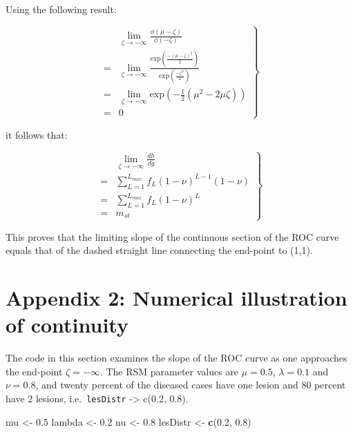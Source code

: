\documentclass[
]{book}
\newenvironment{Shaded}{\begin{snugshade}}{\end{snugshade}}
\newcommand{\FloatTok}[1]{\textcolor[rgb]{0.00,0.00,0.81}{#1}}
\newcommand{\KeywordTok}[1]{\textcolor[rgb]{0.13,0.29,0.53}{\textbf{#1}}}
\newcommand{\NormalTok}[1]{#1}
\newcommand{\StringTok}[1]{\textcolor[rgb]{0.31,0.60,0.02}{#1}}
\begin{document}
Using the following result:

\begin{equation}
\left. 
\begin{aligned}
& \lim_{\zeta \rightarrow -\infty} \frac{\phi \left ( \mu-\zeta \right )}{\phi\left ( -\zeta \right )} \\ 
=&\lim_{\zeta \rightarrow -\infty} \frac{\text{exp}\left ( \frac{-\left (\mu-\zeta  \right )^2}{2} \right )}{\text{exp}\left ( \frac{-\zeta^2}{2} \right )} \\
=& \lim_{\zeta \rightarrow -\infty} \text{exp}\left (-\frac{1}{2} \left( \mu^2 - 2\mu\zeta \right)  \right ) \\
=& 0
\end{aligned}
\right \} 
\label{eq:rsm-predictions-slope-eq5}
\end{equation}

it follows that:

\begin{equation}
\left. 
\begin{aligned}
& \lim_{\zeta \rightarrow -\infty} \frac{dh}{dg} \\ 
=& \sum_{L=1}^{L_{max}} f_L \left ( 1-\nu \right )^{L-1} \left ( 1-\nu \right )\\
=& \sum_{L=1}^{L_{max}} f_L \left ( 1-\nu \right )^{L} \\
=& m_{st}
\end{aligned}
\right \} 
\label{eq:rsm-predictions-slope-eq6}
\end{equation}

This proves that the limiting slope of the continuous section of the ROC curve equals that of the dashed straight line connecting the end-point to (1,1).

\hypertarget{rsm-predictions-appendix2}{%
\section{Appendix 2: Numerical illustration of continuity}\label{rsm-predictions-appendix2}}

The code in this section examines the slope of the ROC curve as one approaches the end-point \(\zeta = -\infty\). The RSM parameter values are \(\mu = 0.5\), \(\lambda = 0.1\) and \(\nu = 0.8\), and twenty percent of the diseased cases have one lesion and 80 percent have 2 lesions, i.e.~\texttt{lesDistr} -\textgreater{} c(0.2, 0.8).

\begin{Shaded}
\begin{Highlighting}[]
\NormalTok{mu <-}\StringTok{ }\FloatTok{0.5}
\NormalTok{lambda <-}\StringTok{ }\FloatTok{0.2}
\NormalTok{nu <-}\StringTok{ }\FloatTok{0.8}
\NormalTok{lesDistr <-}\StringTok{ }\KeywordTok{c}\NormalTok{(}\FloatTok{0.2}\NormalTok{, }\FloatTok{0.8}\NormalTok{)}
\end{Highlighting}
\end{Shaded}
\end{document}
